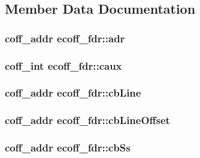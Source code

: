\subsection{Member Data Documentation}
\hypertarget{structecoff__fdr_a65cac13be29242a157093f41d5166c5e}{
\subsubsection[{adr}]{\setlength{\rightskip}{0pt plus 5cm}coff\_\-addr {\bf ecoff\_\-fdr::adr}}}
\label{structecoff__fdr_a65cac13be29242a157093f41d5166c5e}
\hypertarget{structecoff__fdr_ab3dc7c8a9466e13fdade901bc156afe5}{
\subsubsection[{caux}]{\setlength{\rightskip}{0pt plus 5cm}coff\_\-int {\bf ecoff\_\-fdr::caux}}}
\label{structecoff__fdr_ab3dc7c8a9466e13fdade901bc156afe5}
\hypertarget{structecoff__fdr_ac184e88b60679333ddf91d564011cd07}{
\subsubsection[{cbLine}]{\setlength{\rightskip}{0pt plus 5cm}coff\_\-addr {\bf ecoff\_\-fdr::cbLine}}}
\label{structecoff__fdr_ac184e88b60679333ddf91d564011cd07}
\hypertarget{structecoff__fdr_a51eaf945057b46b977e6b232502b8120}{
\subsubsection[{cbLineOffset}]{\setlength{\rightskip}{0pt plus 5cm}coff\_\-addr {\bf ecoff\_\-fdr::cbLineOffset}}}
\label{structecoff__fdr_a51eaf945057b46b977e6b232502b8120}
\hypertarget{structecoff__fdr_a9360bda468013f9e5bdfbf5fad2736d3}{
\subsubsection[{cbSs}]{\setlength{\rightskip}{0pt plus 5cm}coff\_\-addr {\bf ecoff\_\-fdr::cbSs}}}
\label{structecoff__fdr_a9360bda468013f9e5bdfbf5fad2736d3}
